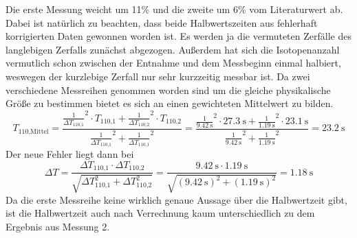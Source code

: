 Die erste Messung weicht um 11\% und die zweite um 6\% vom Literaturwert ab. Dabei ist natürlich zu beachten, dass 
beide Halbwertszeiten aus fehlerhaft korrigierten Daten gewonnen worden ist. Es werden ja die vermuteten Zerfälle des langlebigen Zerfalls zunächst abgezogen.
Außerdem hat sich die Isotopenanzahl vermutlich schon zwischen der Entnahme und dem Messbeginn einmal halbiert, weswegen der kurzlebige Zerfall nur sehr kurzzeitig messbar
ist. Da zwei verschiedene Messreihen genommen worden sind um die gleiche physikalische Größe zu bestimmen bietet es sich an einen gewichteten Mittelwert zu bilden.
\begin{equation}
    T_\text{110,Mittel}=\frac{\frac{1}{\Delta T_\text{110,1}}^2\cdot T_\text{110,1}+\frac{1}{\Delta T_\text{110,2}}^2\cdot T_\text{110,2}}{\frac{1}{\Delta T_\text{110,1}}^2+\frac{1}{\Delta T_\text{110,1}}^2}
    =\frac{\frac{1}{\qty{9.42}{\second}}^2\cdot \qty{27.3}{\second}+\frac{1}{\qty{1.19}{\second}}^2\cdot \qty{23.1}{\second}}{\frac{1}{\qty{9.42}{\second}}^2+\frac{1}{\qty{1.19}{\second}}^2}=\qty{23.2}{\second}
\end{equation}
Der neue Fehler liegt dann bei
\begin{equation}
    \Delta T = \frac{\Delta T_\text{110,1} \cdot \Delta T_\text{110,2} }{\sqrt{\Delta T_\text{110,1}^2+\Delta T_\text{110,2}^2}}
    =\frac{\qty{9.42}{\second}\cdot \qty{1.19}{\second}}{\sqrt{(\qty{9.42}{\second})^2+(\qty{1.19}{\second})^2}}=\qty{1.18}{\second}
\end{equation}
Da die erste Messreihe keine wirklich genaue Aussage über die Halbwertzeit gibt, ist die Halbwertzeit auch nach Verrechnung kaum unterschiedlich zu dem Ergebnis aus Messung 2.
\label{sec:Diskussion}
